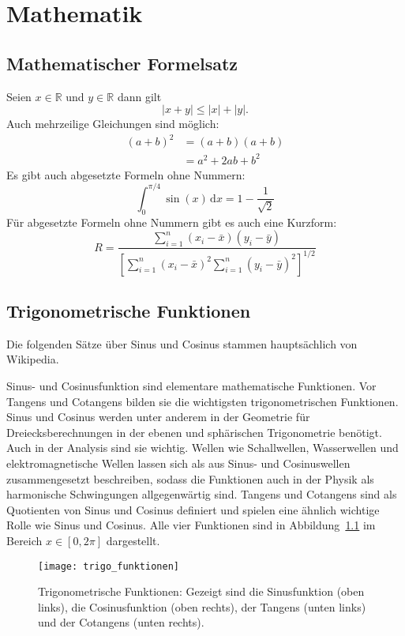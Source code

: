 \chapter{Mathematik}
\label{chap:mathematik}
%
\section{Mathematischer Formelsatz}
Seien \begin{math}x\in\mathbb{R}\end{math} und
$y\in\mathbb{R}$ dann gilt
%
\begin{equation}
  |x+y| \leq |x| + |y|.
\end{equation}
%
Auch mehrzeilige Gleichungen sind möglich:
%
\begin{align}
  (a+b)^{2} & = (a+b)(a+b) \\
           & = a^{2}+2ab+b^{2}
\end{align}
Es gibt auch abgesetzte Formeln ohne Nummern:
%
\begin{equation*}
  \int_{0}^{\pi/4}\sin(x)\,\mathrm{d}x=
  1-\frac{1}{\sqrt{2}}
\end{equation*}
Für abgesetzte Formeln ohne Nummern gibt es auch eine Kurzform:
%
\[
  R=\frac{\sum_{i=1}^{n}(x_{i}-\bar{x})(y_{i}-\bar{y})}{\left[\sum_{i=1}^{n}(x_{i}-\bar{x})^{2}\sum_{i=1}^{n}(y_{i}-\bar{y})^{2}\right]^{1/2}}
\]
%
\section{Trigonometrische Funktionen}
\label{sec:trigo_funk}
Die folgenden Sätze über Sinus und Cosinus stammen hauptsächlich
von Wikipedia.

Sinus- und Cosinusfunktion sind elementare mathematische Funktionen.
Vor Tangens und Cotangens bilden sie die wichtigsten trigonometrischen
Funktionen. Sinus und Cosinus werden unter anderem in der Geometrie
für Dreiecksberechnungen in der ebenen und sphärischen Trigonometrie
benötigt. Auch in der Analysis sind sie wichtig. Wellen wie
Schallwellen, Wasserwellen und elektromagnetische Wellen lassen sich
als aus Sinus- und Cosinuswellen zusammengesetzt beschreiben, sodass
die Funktionen auch in der Physik als harmonische Schwingungen
allgegenwärtig sind. Tangens und Cotangens sind als Quotienten von
Sinus und Cosinus definiert und spielen eine ähnlich wichtige Rolle
wie Sinus und Cosinus. Alle vier Funktionen sind in
Abbildung~\ref{fig:trigo_funk} im Bereich $x\in[0, 2\pi]$ dargestellt.
%
\begin{figure}[ht]
  \centering
  \texttt{[image: trigo\_funktionen]}
  \caption[Trigonometrische Funktionen]{Trigonometrische
    Funktionen: Gezeigt sind die Sinusfunktion
    (oben links), die Cosinusfunktion (oben rechts), der Tangens
    (unten links) und der Cotangens (unten rechts).}
  \label{fig:trigo_funk}
\end{figure}
%
